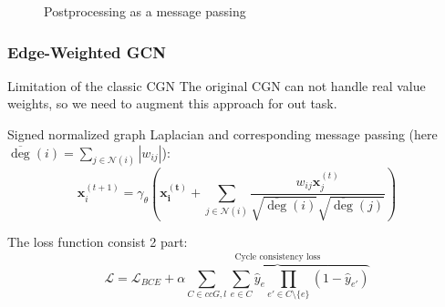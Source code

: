 \documentclass{beamer}
\begin{document}
\begin{frame}
\begin{figure}
        \caption{Postprocessing as a message passing}
    \end{figure}

\end{frame}

\begin{frame}
    \frametitle{Edge-Weighted GCN \cite{jung2022learning}}

    \begin{block}{Limitation of the classic CGN}
        The original CGN can not handle real value weights, so we need to augment this
        approach for out task.
    \end{block}

    Signed normalized graph Laplacian and
    corresponding message passing (here $\overline{\deg}(i) = \sum\limits_{j \in \mathcal{N}(i)} |w_{ij}|$):
    \[
        \mathbf{x}_i^{(t+1)} = \gamma_{\theta} \left(
        \mathbf{x^{(t)}_i} +
        \sum_{j \in \mathcal{N}(i)}
        \frac{w_{ij} \mathbf{x}_j^{(t)}}
        {\sqrt{\overline{\deg}(i)} \sqrt{\overline{\deg}(j)}}
        \right)
    \]

    The loss function consist 2 part:
    \[
        \mathcal{L} = \mathcal{L}_{BCE} + \alpha \overbrace{
            \sum\limits_{C \in cc{G, l}} \sum\limits_{e \in C} \hat{y}_e
            \prod\limits_{e' \in C \setminus \{e\}} (1 - \hat{y}_{e'})
        }^{\text{Cycle consistency loss}}
    \]

\end{frame}
\end{document}
